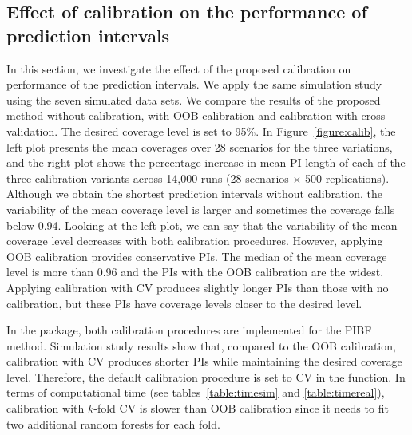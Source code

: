 \subsection{Effect of calibration on the performance of prediction intervals}

In this section, we investigate the effect of the proposed calibration on performance of the prediction intervals. We apply the same simulation study using the seven simulated data sets. We compare the results of the proposed method without calibration, with OOB calibration and calibration with cross-validation. The desired coverage level is set to 95\%. In Figure~\ref{figure:calib}, the left plot presents the mean coverages over 28 scenarios for the three variations, and the right plot shows the percentage increase in mean PI length of each of the three calibration variants across 14,000 runs (28 scenarios $\times$ 500 replications). Although we obtain the shortest prediction intervals without calibration, the variability of the mean coverage level is larger and sometimes the coverage falls below 0.94.  Looking at the left plot, we can say that the variability of the mean coverage level decreases with both calibration procedures. However, applying OOB calibration provides conservative PIs. The median of the mean coverage level is more than 0.96 and the PIs with the OOB calibration are the widest. Applying calibration with CV produces slightly longer PIs than those with no calibration, but these PIs have coverage levels closer to the desired level. 

In the package, both calibration procedures are implemented for the PIBF method. Simulation study results show that, compared to the OOB calibration, calibration with CV produces shorter PIs while maintaining the desired coverage level. Therefore, the default calibration procedure is set to CV in the  function. In terms of computational time (see tables~\ref{table:timesim} and \ref{table:timereal}), calibration with $k$-fold CV is slower than OOB calibration since it needs to fit two additional random forests for each fold. 

